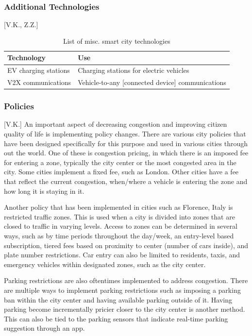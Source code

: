 \documentclass[12pt]{article}                       %
\begin{document}
\subsubsection{Additional Technologies}[V.K., Z.Z.]
\begin{table}[H]
    \centering
    \small
    \begin{tabular}{l|l}
        \textbf{Technology} & \textbf{Use} \\
        \hline{}
        
        EV charging stations &
        Charging stations for electric vehicles \\
        \hline{}
        
        V2X communications &
        Vehicle-to-any [connected device] communications
    \end{tabular}
    \caption{List of misc. smart city technologies}
    \label{tab:additional_tech}
\end{table}

\subsubsection{Policies}[V.K.] \label{sec:policies}
An important aspect of decreasing congestion and improving citizen quality of life is implementing policy changes. There are various city policies that have been designed specifically for this purpose and used in various cities through out the world. One of these is congestion pricing, in which there is an imposed fee for entering a zone, typically the city center or the most congested area in the city. Some cities implement a fixed fee, such as London. Other cities have a fee that reflect the current congestion, when/where a vehicle is entering the zone and how long it is staying in it.

Another policy that has been implemented in cities such as Florence, Italy is restricted traffic zones. This is used when a city is divided into zones that are closed to traffic in varying levels. Access to zones can be determined in several ways, such as by time periods throughout the day/week, an entry-level based subscription, tiered fees based on proximity to center (number of cars inside), and plate number restrictions. Car entry can also be limited to residents, taxis, and emergency vehicles within designated zones, such as the city center. 

Parking restrictions are also oftentimes implemented to address congestion. There are multiple ways to implement parking restrictions such as imposing a parking ban within the city center and having available parking outside of it. Having parking become incrementally pricier closer to the city center is another method. This can also be tied to the parking sensors that indicate real-time parking suggestion through an app.
\end{document}
